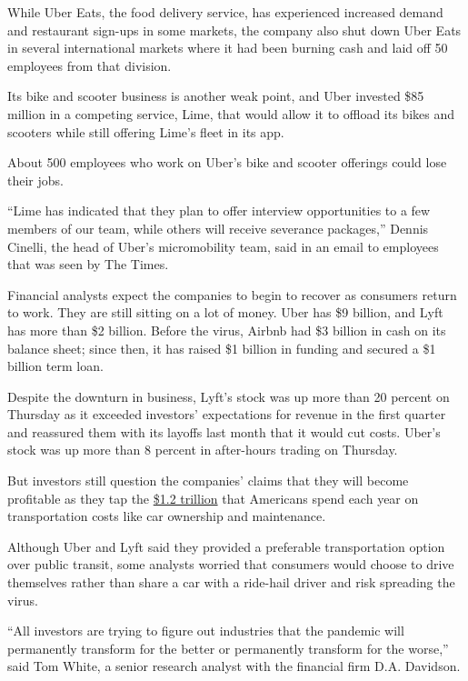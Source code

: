 While Uber Eats, the food delivery service, has experienced increased
demand and restaurant sign-ups in some markets, the company also shut
down Uber Eats in several international markets where it had been
burning cash and laid off 50 employees from that division.

Its bike and scooter business is another weak point, and Uber invested
\$85 million in a competing service, Lime, that would allow it to
offload its bikes and scooters while still offering Lime's fleet in its
app.

About 500 employees who work on Uber's bike and scooter offerings could
lose their jobs.

``Lime has indicated that they plan to offer interview opportunities to
a few members of our team, while others will receive severance
packages,'' Dennis Cinelli, the head of Uber's micromobility team, said
in an email to employees that was seen by The Times.

Financial analysts expect the companies to begin to recover as consumers
return to work. They are still sitting on a lot of money. Uber has \$9
billion, and Lyft has more than \$2 billion. Before the virus, Airbnb
had \$3 billion in cash on its balance sheet; since then, it has raised
\$1 billion in funding and secured a \$1 billion term loan.

Despite the downturn in business, Lyft's stock was up more than 20
percent on Thursday as it exceeded investors' expectations for revenue
in the first quarter and reassured them with its layoffs last month that
it would cut costs. Uber's stock was up more than 8 percent in
after-hours trading on Thursday.

But investors still question the companies' claims that they will become
profitable as they tap the
\href{https://www.bts.gov/browse-statistical-products-and-data/transportation-economic-trends/tet-2018-chapter-6-household}{\$1.2
trillion} that Americans spend each year on transportation costs like
car ownership and maintenance.

Although Uber and Lyft said they provided a preferable transportation
option over public transit, some analysts worried that consumers would
choose to drive themselves rather than share a car with a ride-hail
driver and risk spreading the virus.

``All investors are trying to figure out industries that the pandemic
will permanently transform for the better or permanently transform for
the worse,'' said Tom White, a senior research analyst with the
financial firm D.A. Davidson.

